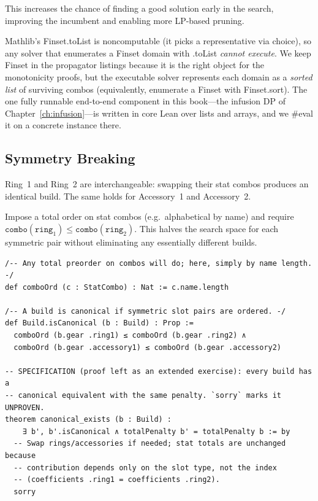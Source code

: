 \documentclass[11pt, a4paper, oneside]{book}
\newcommand{\li}[1]{{\ttfamily\small\color{deepblue}#1}}
\begin{document}
This increases the chance of finding a good solution early in the search,
improving the incumbent and enabling more LP-based pruning.

\begin{warningbox}[title={Finsets are for reasoning; lists are for running}]
Mathlib's \li{Finset.toList} is \li{noncomputable} (it picks a representative via
choice), so any solver that enumerates a \li{Finset} domain with \li{.toList}
\emph{cannot execute}.  We keep \li{Finset} in the propagator listings because it
is the right object for the monotonicity proofs, but the executable solver
represents each domain as a \emph{sorted list} of surviving combos (equivalently,
enumerate a \li{Finset} with \li{Finset.sort}).  The one fully runnable
end-to-end component in this book---the infusion DP of
Chapter~\ref{ch:infusion}---is written in core Lean over lists and arrays, and
we \li{\#eval} it on a concrete instance there.
\end{warningbox}

\subsection{Symmetry Breaking}

\begin{propbox}[title={Ring and Accessory Symmetry}]
Ring~1 and Ring~2 are interchangeable: swapping their stat combos produces
an identical build.  The same holds for Accessory~1 and Accessory~2.
\end{propbox}

Impose a total order on stat combos (e.g.\ alphabetical by name) and
require $\texttt{combo}(\texttt{ring}_1) \leq \texttt{combo}(\texttt{ring}_2)$.
This halves the search space for each symmetric pair without eliminating any
essentially different builds.

\begin{leanbox}[title={Lean 4 --- Symmetry Breaking (specification)}]
\begin{verbatim}
/-- Any total preorder on combos will do; here, simply by name length. -/
def comboOrd (c : StatCombo) : Nat := c.name.length

/-- A build is canonical if symmetric slot pairs are ordered. -/
def Build.isCanonical (b : Build) : Prop :=
  comboOrd (b.gear .ring1) ≤ comboOrd (b.gear .ring2) ∧
  comboOrd (b.gear .accessory1) ≤ comboOrd (b.gear .accessory2)

-- SPECIFICATION (proof left as an extended exercise): every build has a
-- canonical equivalent with the same penalty. `sorry` marks it UNPROVEN.
theorem canonical_exists (b : Build) :
    ∃ b', b'.isCanonical ∧ totalPenalty b' = totalPenalty b := by
  -- Swap rings/accessories if needed; stat totals are unchanged because
  -- contribution depends only on the slot type, not the index
  -- (coefficients .ring1 = coefficients .ring2).
  sorry
\end{verbatim}
\end{leanbox}
\end{document}
